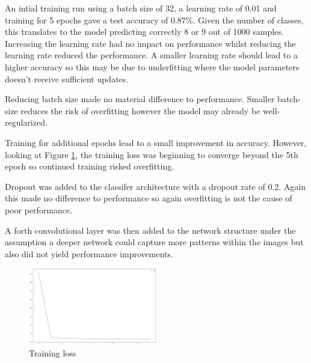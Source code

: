 \documentclass{article}
\begin{document}
An intial training run using a batch size of 32, a learning rate of 0.01 and training for 5 epochs gave a test accuracy of 0.87\%. Given the number of classes, this translates to the model predicting correctly 8 or 9 out of 1000 samples.
Increasing the learning rate had no impact on performance whilst reducing the learning rate reduced the performance. A smaller learning rate should lead to a higher accuracy \cite{smith2018dont} so this may be due to underfitting where the model parameters doesn't receive sufficient updates.


Reducing batch size made no material difference to performance. Smaller batch-size reduces the risk of overfitting however the model may already be well-regularized.

Training for additional epochs lead to a small improvement in accuracy. However, looking at Figure \ref{fig:training_loss}, the training loss was beginning to converge beyond the 5th epoch so continued training risked overfitting.

Dropout was added to the classifer architecture with a dropout rate of 0.2. Again this made no difference to performance so again overfitting is not the cause of poor performance.

A forth convolutional layer was then added to the network structure under the assumption a deeper network could capture more patterns within the images but also did not yield performance improvements. 

\begin{figure}[ht]
    \centering
    \includegraphics[width=0.5\textwidth]{train_loss.png}
    \caption{Training loss}
    \label{fig:training_loss}
\end{figure}
\end{document}
